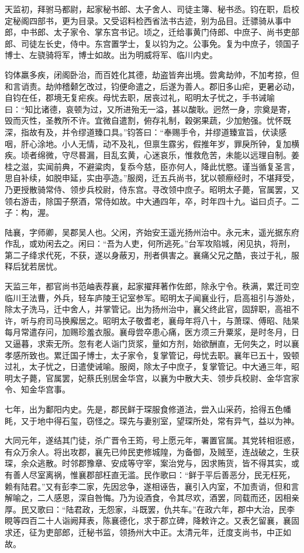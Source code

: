 \documentclass[12pt,UTF8]{ctexbook}
\begin{document}
天监初，拜驸马都尉，起家秘书郎、太子舍人、司徒主簿、秘书丞。钧在职，启校定秘阁四部书，更为目录。又受诏料检西省法书古迹，别为品目。迁骠骑从事中郎，中书郎、太子家令、掌东宫书记。顷之，迁给事黄门侍郎、中庶子、尚书吏部郎、司徒左长史，侍中。东宫置学士，复以钧为之。公事免。复为中庶子，领国子博士、左骁骑将军，博士如故。出为明威将军、临川内史。

钧体羸多疾，闭阁卧治，而百姓化其德，劫盗皆奔出境。尝禽劫帅，不加考掠，但和言诮责。劫帅稽颡乞改过，钧便命遣之，后遂为善人。郡旧多山疟，更暑必动，自钧在任，郡境无复疟疾。母忧去职，居丧过礼，昭明太子忧之，手书诫喻曰：“知比诸德，哀顿为过，又所进殆无一溢，甚以酸耿。迥然一身，宗奠是寄，毁而灭性，圣教所不许。宜微自遣割，俯存礼制，穀粥果蔬，少加勉强。忧怀既深，指故有及，并令缪道臻口具。”钧答曰：“奉赐手令，并缪道臻宣旨，伏读感咽，肝心涂地。小人无情，动不及礼，但禀生霡劣，假推年岁，罪戾所钟，复加横疾。顷者绵微，守尽晷漏，目乱玄黄，心迷哀乐，惟救危苦，未能以远理自制。姜桂之滋，实闻前典，不避粱肉，复忝今慈，臣亦何人，降此忧愍。谨当循复圣言，思自补续，如脱申延，实由亭造。”服阕，迁五兵尚书，犹以顿瘵经时，不堪拜受，乃更授散骑常侍、领步兵校尉，侍东宫。寻改领中庶子。昭明太子薨，官属罢，又领右游击，除国子祭酒，常侍如故。中大通四年，卒，时年四十九。谥曰贞子。二子：构，渥。

陆襄，字师卿，吴郡吴人也。父闲，齐始安王遥光扬州治中。永元末，遥光据东府作乱，或劝闲去之。闲曰：“吾为人吏，何所逃死。”台军攻陷城，闲见执，将刑，第二子绛求代死，不获，遂以身蔽刃，刑者俱害之。襄痛父兄之酷，丧过于礼，服释后犹若居忧。

天监三年，都官尚书范岫表荐襄，起家擢拜著作佐郎，除永宁令。秩满，累迁司空临川王法曹，外兵，轻车庐陵王记室参军。昭明太子闻襄业行，启高祖引与游处，除太子洗马，迁中舍人，并掌管记。出为扬州治中，襄父终此官，固辞职，高祖不许，听与府司马换廨居之。昭明太子敬耆老，襄母年将八十，与萧琛、傅昭、陆杲每月常遣存问，加赐珍羞衣服。襄母尝卒患心痛，医方须三升粟浆，是时冬月，日又逼暮，求索无所。忽有老人诣门货浆，量如方剂，始欲酬直，无何失之，时以襄孝感所致也。累迁国子博士，太子家令，复掌管记，母忧去职。襄年已五十，毁顿过礼，太子忧之，日遣使诫喻。服阕，除太子中庶子，复掌管记。中大通三年，昭明太子薨，官属罢，妃蔡氏别居金华宫，以襄为中散大夫、领步兵校尉、金华宫家令、知金华宫事。

七年，出为鄱阳内史。先是，郡民鲜于琛服食修道法，尝入山采药，拾得五色幡眊，又于地中得石玺，窃怪之。琛先与妻别室，望琛所处，常有异气，益以为神。

大同元年，遂结其门徒，杀广晋令王筠，号上愿元年，署置官属。其党转相诳惑，有众万余人。将出攻郡，襄先已帅民吏修城隍，为备御，及贼至，连战破之，生获琛，余众逃散。时邻郡豫章、安成等守宰，案治党与，因求贿货，皆不得其实，或有善人尽室离祸，惟襄郡部枉直无滥。民作歌曰：“鲜于平后善恶分，民无枉死，赖有陆君。”又有彭李二家，先因忿争，遂相诬告，襄引入内室，不加责诮，但和言解喻之，二人感恩，深自咎悔。乃为设酒食，令其尽欢，酒罢，同载而还，因相亲厚。民又歌曰：“陆君政，无怨家，斗既罢，仇共车。”在政六年，郡中大治，民李睍等四百二十人诣阙拜表，陈襄德化，求于郡立碑，降敕许之。又表乞留襄，襄固求还，征为吏部郎，迁秘书监，领扬州大中正。太清元年，迁度支尚书，中正如故。
\end{document}
